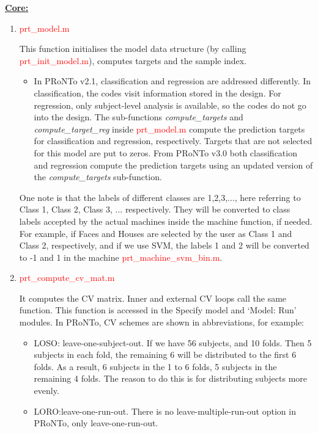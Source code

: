 \textbf{\underline{Core:}}

\begin{enumerate}

\item \textcolor{red}{prt\_model.m}

This function initialises the model data structure (by calling \textcolor{red}{prt\_init\_model.m}), computes targets and the sample index.

\begin{itemize}
\item In PRoNTo v2.1, classification and regression are addressed differently. In classification, the codes visit information stored in the design. For regression, only subject-level analysis is available, so the codes do not go into the design.
The sub-functions \textit{compute\_targets} and \textit{compute\_target\_reg} inside \textcolor{red}{prt\_model.m} compute the prediction targets for classification and regression, respectively. Targets that are not selected for this model are put to zeros. From PRoNTo v3.0 both classification and regression compute the prediction targets using an updated version of the \textit{compute\_targets} sub-function.
\end{itemize}
 
One note is that the labels of different classes are 1,2,3,..., here referring to Class 1, Class 2, Class 3, ... respectively. They will be converted to class labels accepted by the actual machines inside the machine function, if needed. For example, if Faces and Houses are selected by the user as Class 1 and Class 2, respectively, and if we use SVM, the labels 1 and 2 will be converted to -1 and 1 in the machine \textcolor{red}{prt\_machine\_svm\_bin.m}.

\item \textcolor{red}{prt\_compute\_cv\_mat.m}

It computes the CV matrix. Inner and external CV loops call the same function. This function is accessed in the Specify model and `Model: Run' modules. In PRoNTo, CV schemes are shown in abbreviations, for example:

\begin{itemize}
\item LOSO: leave-one-subject-out. If we have 56 subjects, and 10 folds. Then 5 subjects in each fold, the remaining 6 will be distributed to the first 6 folds. As a result, 6 subjects in the 1 to 6 folds, 5 subjects in the remaining 4 folds. The reason to do this is for distributing subjects more evenly.
\item LORO:leave-one-run-out. There is no leave-multiple-run-out option in PRoNTo, only leave-one-run-out.
\end{itemize}


\end{enumerate}
